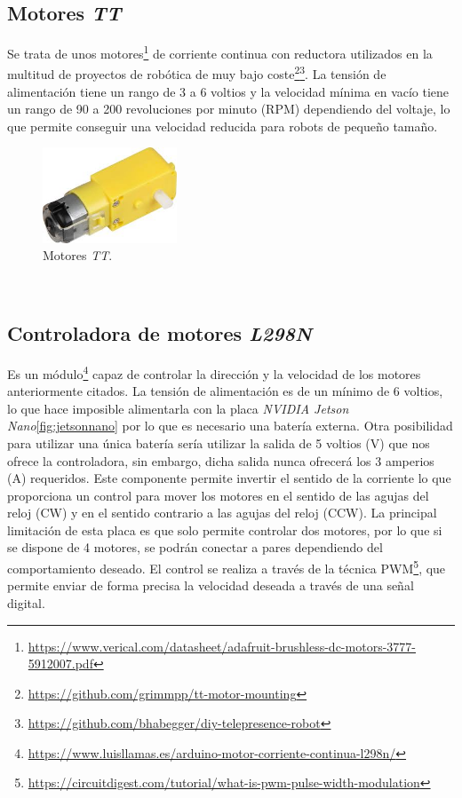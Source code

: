 \subsection{Motores \textit{TT}}
\label{subsection:motortt}
Se trata de unos motores\footnote{\url{https://www.verical.com/datasheet/adafruit-brushless-dc-motors-3777-5912007.pdf}} de corriente continua con reductora utilizados en la multitud de proyectos de robótica de muy bajo coste\footnote{\url{https://github.com/grimmpp/tt-motor-mounting}}\footnote{\url{https://github.com/bhabegger/diy-telepresence-robot}}. La tensión de alimentación tiene un rango de 3 a 6 voltios y la velocidad mínima en vacío tiene un rango de 90 a 200 revoluciones por minuto (RPM) dependiendo del voltaje, lo que permite conseguir una velocidad reducida para robots de pequeño tamaño.\\

\begin{figure} [h!]
	\begin{center}
		\includegraphics[width=4cm]{figs/motorTT}
	\end{center}
	\caption{Motores \textit{TT}.}
	\label{fig:motorTT}
\end{figure}\

\subsection{Controladora de motores \textit{L298N}}
\label{subsection:l298n}
Es un módulo\footnote{\url{https://www.luisllamas.es/arduino-motor-corriente-continua-l298n/}} capaz de controlar la dirección y la velocidad de los motores anteriormente citados. La tensión de alimentación es de un mínimo de 6 voltios, lo que hace imposible alimentarla con la placa \textit{NVIDIA Jetson Nano}\ref{fig:jetsonnano} por lo que es necesario una batería externa. Otra posibilidad para utilizar una única batería sería utilizar la salida de 5 voltios (V) que nos ofrece la controladora, sin embargo, dicha salida nunca ofrecerá los 3 amperios (A) requeridos. Este componente permite invertir el sentido de la corriente lo que proporciona un control para mover los motores en el sentido de las agujas del reloj (CW) y en el sentido contrario a las agujas del reloj (CCW). La principal limitación de esta placa es que solo permite controlar dos motores, por lo que si se dispone de 4 motores, se podrán conectar a pares dependiendo del comportamiento deseado. El control se realiza a través de la técnica PWM\footnote{\url{https://circuitdigest.com/tutorial/what-is-pwm-pulse-width-modulation}}, que permite enviar de forma precisa la velocidad deseada a través de una señal digital.\\

